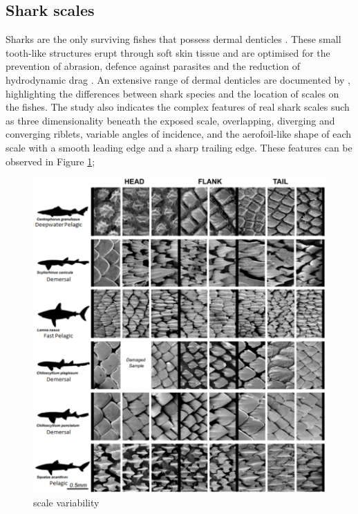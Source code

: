 \documentclass[12pt,oneside,a4paper]{article}
\begin{document}
\subsection{Shark scales}
\label{section:literatureReview:sharkScales}
Sharks are the only surviving fishes that possess dermal denticles \citep{fletcher2014phd}. These small tooth-like structures erupt through soft skin tissue and are optimised for the prevention of abrasion, defence against parasites and the reduction of hydrodynamic drag \citep{fletcher2014phd}. An extensive range of dermal denticles are documented by \cite{reif1985}, highlighting the differences between shark species and the location of scales on the fishes. The study also indicates the complex features of real shark scales such as three dimensionality beneath the exposed scale, overlapping, diverging and converging riblets, variable angles of incidence, and the aerofoil-like shape of each scale with a smooth leading edge and a sharp trailing edge. These features can be observed in Figure \ref{figure:literatureReview:scaleVariabilityFletcher};
\begin{figure}[!h]
\centering
\includegraphics[width=14cm]{images/litReview/scaleVariabilityFletcher.png}
\caption{scale variability \citep{fletcher2014phd}}
\label{figure:literatureReview:scaleVariabilityFletcher}
\end{figure}
\end{document}
